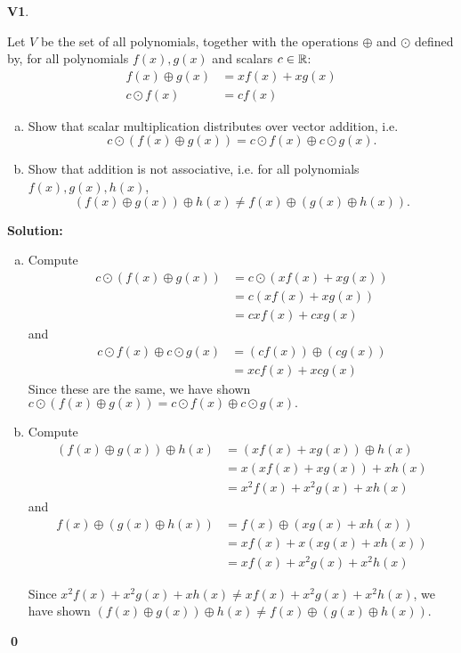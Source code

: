 \documentclass{article}
\newenvironment{problem}[1]
{
	\begin{flushleft}
	\textbf{#1}.
	\ignorespaces
}
{
	\end{flushleft}
}
\newenvironment{solution}
{
	\ignorespaces
	\textbf{Solution:}
}
{
	\ignorespacesafterend
	\begin{flushright}
	{\bfseries \qed}
	\end{flushright}
}
\begin{document}
\begin{problem}{V1}
Let \(V\) be the set of all polynomials, together with the operations \(\oplus\) and \(\odot\) defined by, for all polynomials \(f(x),g(x)\) and scalars \(c \in \mathbb{R}\):
\begin{align*}
f(x) \oplus g(x) &= xf(x)+xg(x) \\
c\odot f(x) &= cf(x)
\end{align*}
\begin{enumerate}[(a)]
\item Show that scalar multiplication distributes over vector addition, i.e. \[c\odot \left(f(x)\oplus g(x) \right) = c \odot f(x) \oplus c \odot g(x).\]
\item Show that addition is not associative, i.e. for all polynomials $f(x),g(x),h(x)$, \[\left( f(x) \oplus g(x) \right) \oplus h(x) \neq f(x) \oplus \left( g(x) \oplus h(x) \right) .\]
\end{enumerate}
\end{problem}
\begin{solution}
\begin{enumerate}[(a)]
\item
Compute
\begin{align*}
	c \odot \left(f(x) \oplus g(x) \right) 
	&= c \odot \left(xf(x)+xg(x)\right) \\
	&= c\left(xf(x)+xg(x) \right) \\
	&= cxf(x)+cxg(x) 
\end{align*}
and
\begin{align*}
	c\odot f(x) \oplus c \odot g(x) 
	&= (cf(x)) \oplus (cg(x))\\
	&= xcf(x)+xcg(x)
\end{align*}
Since these are the same, we have shown \(c\odot \left(f(x)\oplus g(x) \right) = c \odot f(x) \oplus c \odot g(x).\)
\item
Compute
\begin{align*}
	\left( f(x) \oplus g(x) \right) \oplus h(x) 
	&=\left(xf(x)+xg(x) \right) \oplus h(x)\\
	&= x\left(xf(x)+xg(x)\right)+xh(x) \\
	&= x^2f(x)+x^2g(x)+xh(x)
\end{align*}
and 
\begin{align*}
	f(x) \oplus \left( g(x) \oplus h(x) \right) 
	&=f(x) \oplus \left(xg(x)+xh(x)\right) \\
	&=xf(x)+x\left(xg(x)+xh(x)\right) \\
	&=xf(x)+x^2g(x)+x^2h(x)
\end{align*}


Since $x^2f(x)+x^2g(x)+xh(x)\neq xf(x)+x^2g(x)+x^2h(x)$, we have shown \(\left( f(x) \oplus g(x) \right) \oplus h(x) \neq f(x) \oplus \left( g(x) \oplus h(x) \right) .\)
\end{enumerate}
\end{solution}
\end{document}

